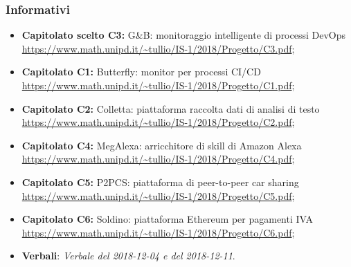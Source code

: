		\subsubsection{Informativi}
		\begin{itemize}
			\item \textbf{Capitolato scelto C3:} G\&B: monitoraggio intelligente di processi DevOps \\ 
			\url{https://www.math.unipd.it/~tullio/IS-1/2018/Progetto/C3.pdf};
 			\item \textbf{Capitolato  C1:} Butterfly: monitor per processi CI/CD \\ \url{https://www.math.unipd.it/~tullio/IS-1/2018/Progetto/C1.pdf};
 			\item \textbf{Capitolato C2:} Colletta: piattaforma raccolta dati di analisi di testo \\ 
 			\url{https://www.math.unipd.it/~tullio/IS-1/2018/Progetto/C2.pdf};
 			\item \textbf{Capitolato C4:} MegAlexa: arricchitore di skill di Amazon Alexa \\ \url{https://www.math.unipd.it/~tullio/IS-1/2018/Progetto/C4.pdf};
 			\item \textbf{Capitolato C5:} P2PCS: piattaforma di peer-to-peer car sharing \\ \url{https://www.math.unipd.it/~tullio/IS-1/2018/Progetto/C5.pdf};
 			\item \textbf{Capitolato C6:} Soldino: piattaforma Ethereum per pagamenti IVA \\ \url{https://www.math.unipd.it/~tullio/IS-1/2018/Progetto/C6.pdf};
 			\item \textbf{Verbali}: \emph{Verbale del 2018-12-04 e del 2018-12-11}.
 			
		\end{itemize}
	\pagebreak
		


